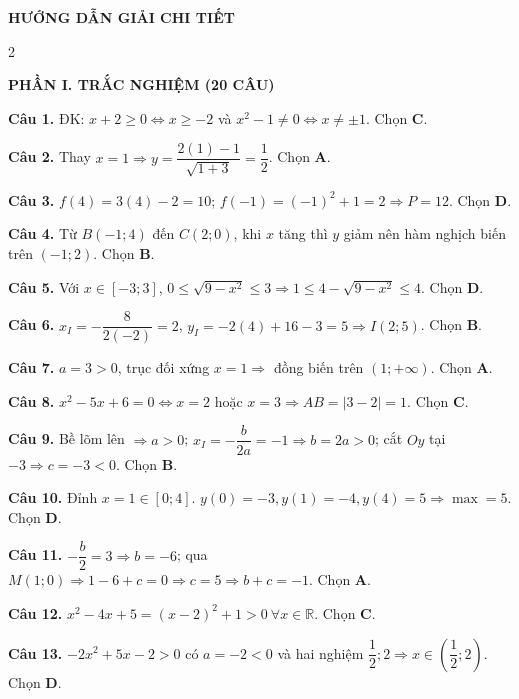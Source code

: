 \documentclass[12pt,a4paper]{article}
\begin{document}
\vspace{4pt}
\begin{center}
  {\large\bfseries\color{ink} HƯỚNG DẪN GIẢI CHI TIẾT}
\end{center}
\vspace{1pt}

\begin{multicols}{2}
\raggedcolumns
\footnotesize

\textbf{\color{accent}PHẦN I. TRẮC NGHIỆM (20 CÂU)}

\textbf{Câu 1.} ĐK: $x + 2 \ge 0 \Leftrightarrow x \ge -2$ và $x^2 - 1 \ne 0 \Leftrightarrow x \ne \pm 1$. Chọn \textbf{C}.

\textbf{Câu 2.} Thay $x = 1 \Rightarrow y = \dfrac{2(1)-1}{\sqrt{1+3}} = \dfrac{1}{2}$. Chọn \textbf{A}.

\textbf{Câu 3.} $f(4) = 3(4) - 2 = 10$; $f(-1) = (-1)^2 + 1 = 2 \Rightarrow P = 12$. Chọn \textbf{D}.

\textbf{Câu 4.} Từ $B(-1; 4)$ đến $C(2; 0)$, khi $x$ tăng thì $y$ giảm nên hàm nghịch biến trên $(-1; 2)$. Chọn \textbf{B}.

\textbf{Câu 5.} Với $x \in [-3; 3]$, $0 \le \sqrt{9 - x^2} \le 3 \Rightarrow 1 \le 4 - \sqrt{9 - x^2} \le 4$. Chọn \textbf{D}.

\textbf{Câu 6.} $x_I = -\dfrac{8}{2(-2)} = 2$, $y_I = -2(4) + 16 - 3 = 5 \Rightarrow I(2; 5)$. Chọn \textbf{B}.

\textbf{Câu 7.} $a = 3 > 0$, trục đối xứng $x = 1 \Rightarrow$ đồng biến trên $(1; +\infty)$. Chọn \textbf{A}.

\textbf{Câu 8.} $x^2 - 5x + 6 = 0 \Leftrightarrow x = 2$ hoặc $x = 3 \Rightarrow AB = |3 - 2| = 1$. Chọn \textbf{C}.

\textbf{Câu 9.} Bề lõm lên $\Rightarrow a > 0$; $x_I = -\dfrac{b}{2a} = -1 \Rightarrow b = 2a > 0$; cắt $Oy$ tại $-3 \Rightarrow c = -3 < 0$. Chọn \textbf{B}.

\textbf{Câu 10.} Đỉnh $x = 1 \in [0; 4]$. $y(0) = -3, y(1) = -4, y(4) = 5 \Rightarrow \max = 5$. Chọn \textbf{D}.

\textbf{Câu 11.} $-\dfrac{b}{2} = 3 \Rightarrow b = -6$; qua $M(1; 0) \Rightarrow 1 - 6 + c = 0 \Rightarrow c = 5 \Rightarrow b + c = -1$. Chọn \textbf{A}.

\textbf{Câu 12.} $x^2 - 4x + 5 = (x - 2)^2 + 1 > 0\ \forall x \in \mathbb{R}$. Chọn \textbf{C}.

\textbf{Câu 13.} $-2x^2 + 5x - 2 > 0$ có $a = -2 < 0$ và hai nghiệm $\dfrac{1}{2}; 2 \Rightarrow x \in \left(\dfrac{1}{2}; 2\right)$. Chọn \textbf{D}.


\end{multicols}
\end{document}
